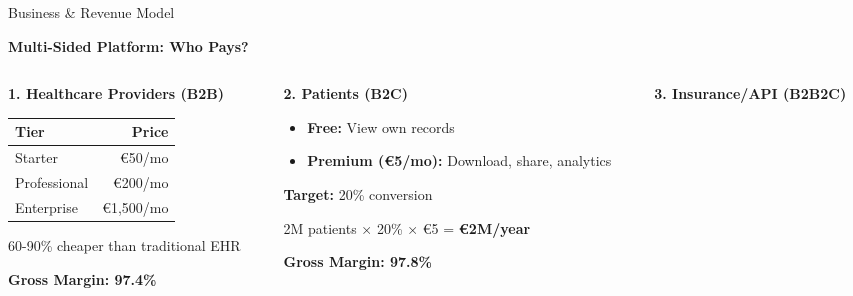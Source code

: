 \documentclass[aspectratio=169,xcolor=dvipsnames,14pt]{beamer}
\begin{document}
\begin{frame}{Business \& Revenue Model}

  \textbf{\textcolor{FadjmaBlue}{Multi-Sided Platform: Who Pays?}}

  \begin{columns}[T]
    \begin{column}{0.33\textwidth}
      \textbf{1. Healthcare Providers (B2B)}

      \begin{table}
        \scriptsize
        \begin{tabular}{lr}
          \toprule
          \textbf{Tier} & \textbf{Price} \\
          \midrule
          Starter & €50/mo \\
          Professional & €200/mo \\
          Enterprise & €1,500/mo \\
          \bottomrule
        \end{tabular}
      \end{table}

      \vspace{0.2cm}

      \textcolor{SuccessGreen}{60-90\% cheaper} than traditional EHR

      \textbf{Gross Margin: 97.4\%}
    \end{column}

    \begin{column}{0.33\textwidth}
      \textbf{2. Patients (B2C)}

      \begin{itemize}
        \item \textbf{Free:} View own records
        \item \textbf{Premium (€5/mo):} Download, share, analytics
      \end{itemize}

      \vspace{0.2cm}

      \textbf{Target:} 20\% conversion

      2M patients × 20\% × €5 = \textbf{€2M/year}

      \textbf{Gross Margin: 97.8\%}
    \end{column}

    \begin{column}{0.33\textwidth}
      \textbf{3. Insurance/API (B2B2C)}


\end{column}
\end{columns}
\end{frame}
\end{document}
